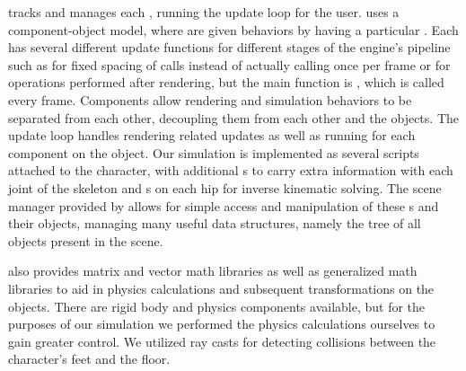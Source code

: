 	\unity{} tracks and manages each , running the update loop for the user.  \unity{} uses a component-object model, where  are given behaviors by having a particular .  Each  has several different update functions for different stages of the engine's pipeline such as  for fixed spacing of calls instead of actually calling once per frame or  for operations performed after rendering, but the main function is , which is called every frame.  Components allow rendering and simulation behaviors to be separated from each other, decoupling them from each other and the objects.  The update loop handles rendering related updates as well as running  for each component on the object.  Our simulation is implemented as several  scripts attached to the character, with additional s to carry extra information with each joint of the skeleton and s on each hip for inverse kinematic solving.  The scene manager provided by \unity{} allows for simple access and manipulation of these s and their objects, managing many useful data structures, namely the tree of all objects present in the scene.
	
	\unity{} also provides matrix and vector math libraries as well as generalized math libraries to aid in physics calculations and subsequent transformations on the objects.  There are rigid body and physics components available, but for the purposes of our simulation we performed the physics calculations ourselves to gain greater control.  We utilized \unity{} ray casts for detecting collisions between the character's feet and the floor.
	
